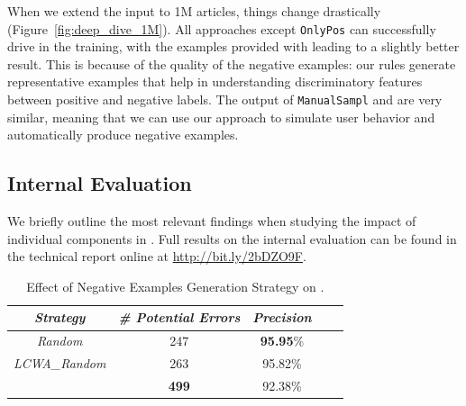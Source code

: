 When we extend the input to 1M articles, things change drastically (Figure~\ref{fig:deep_dive_1M}). All approaches except \texttt{OnlyPos} can successfully drive \deepdive in the training, with the examples provided with \krd leading to a slightly better result. This is because of the quality of the negative examples: our rules generate representative examples that help \deepdive in understanding discriminatory features between positive and negative labels.
The output of \texttt{ManualSampl} and \krd are very similar, meaning that we can use our approach to simulate user behavior and automatically produce negative examples. 

\vspace{-1ex}
\subsection{Internal Evaluation} \label{sec:krd_int_evaluation}
We briefly outline the most relevant findings when studying the impact of individual components in \krd.
Full results on the internal evaluation %
can be found in the technical report online at \url{http://bit.ly/2bDZO9F}.

\begin{table}[htb]
	\centering
	\caption{Effect of Negative Examples Generation Strategy on \dbpedia.}
	\label{tab:random_neg_examples}
	\begin{tabular}{|c|c|c|c|c|}
		\hline
		\hline
		{\it Strategy}&{\it \# Potential Errors} & {\it Precision} \tabularnewline
		\hline
		\emph{Random} & 247 & \textbf{95.95}\%\tabularnewline
		\emph{LCWA\_Random} & 263 & 95.82\% \tabularnewline
		\krd & \textbf{499} & 92.38\%\tabularnewline
		\hline
	\end{tabular}
\end{table}


